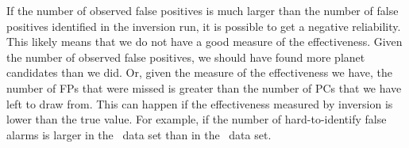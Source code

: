If the number of observed false positives is much larger than the number of false positives identified in the inversion run, it is possible to get a negative reliability. This likely means that we do not have a good measure of the effectiveness.  Given the number of observed false positives, we should have found more planet candidates than we did. Or, given the measure of the effectiveness we have, the number of FPs that were missed is greater than the number of PCs that we have left to draw from.  This can happen if the effectiveness measured by inversion is lower than the true value. For example, if the number of hard-to-identify false alarms is larger in the \invtce\ data set than in the \opstce\ data set.   